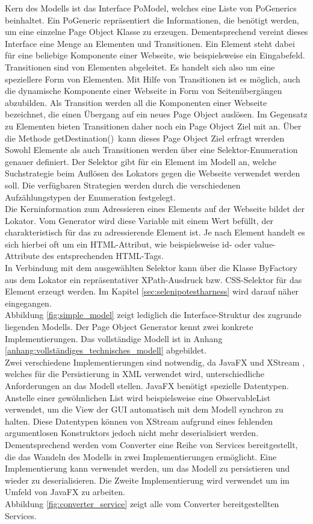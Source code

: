 Kern des Modells ist das Interface PoModel, welches eine Liste von PoGenerics beinhaltet. Ein PoGeneric repräsentiert die Informationen, die benötigt werden, um eine einzelne Page Object Klasse zu erzeugen. Dementsprechend vereint dieses Interface eine Menge an Elementen und Transitionen.
Ein Element steht dabei für eine beliebige Komponente einer Webseite, wie beispielsweise ein Eingabefeld.
Transitionen sind von Elementen abgeleitet. Es handelt sich also um eine speziellere Form von Elementen. Mit Hilfe von Transitionen ist es möglich, auch die dynamische Komponente einer Webseite in Form von Seitenübergängen abzubilden. Als Transition werden all die Komponenten einer Webseite bezeichnet, die einen Übergang auf ein neues Page Object auslösen. Im Gegensatz zu Elementen bieten Transitionen daher noch ein Page Object Ziel mit an. Über die Methode \grq getDestination()\grq\ kann dieses Page Object Ziel erfragt wrerden\\
Sowohl Elemente als auch Transitionen werden über eine Selektor-Enumeration genauer definiert.
Der Selektor gibt für ein Element im Modell an, welche Suchstrategie beim Auflösen des Lokators gegen die Webseite verwendet werden soll.
Die verfügbaren Strategien werden durch die verschiedenen Aufzählungstypen der Enumeration festgelegt.\\
Die Kerninformation zum Adressieren eines Elements auf der Webseite bildet der Lokator. Vom Generator wird diese Variable mit einem Wert befüllt, der charakteristisch für das zu adressierende Element ist. Je nach Element handelt es sich hierbei oft um ein HTML-Attribut, wie beispielsweise id- oder value-Attribute des entsprechenden HTML-Tags.\\
In Verbindung mit dem ausgewählten Selektor kann über die Klasse ByFactory aus dem Lokator ein repräsentativer XPath-Ausdruck bzw. CSS-Selektor für das Element erzeugt werden. Im Kapitel \ref{sec:selenipotestharness} wird darauf näher eingegangen.\\
Abbildung \ref{fig:simple_model} zeigt lediglich die Interface-Struktur des zugrunde liegenden Modells. Der Page Object Generator kennt zwei konkrete Implementierungen. Das vollständige Modell ist in Anhang \ref{anhang:vollständiges_technisches_modell} abgebildet.\\
Zwei verschiedene Implementierungen sind notwendig, da JavaFX und XStream \cite{joe_walnes_xstream_2015}, welches für die Persistierung in XML verwendet wird, unterschiedliche Anforderungen an das Modell stellen. JavaFX benötigt spezielle Datentypen. Anstelle einer gewöhnlichen List wird beispielsweise eine ObservableList verwendet, um die View der GUI automatisch mit dem Modell synchron zu halten. Diese Datentypen können von XStream aufgrund eines fehlenden argumentlosen Konstruktors jedoch nicht mehr deserialisiert werden.
Dementsprechend werden vom Converter eine Reihe von Services bereitgestellt, die das Wandeln des Modells in zwei Implementierungen ermöglicht. Eine Implementierung kann verwendet werden, um das Modell zu persistieren und wieder zu deserialisieren. Die Zweite Implementierung wird verwendet um im Umfeld von JavaFX zu arbeiten.\\
Abbildung \ref{fig:converter_service} zeigt alle vom Converter bereitgestellten Services. 

